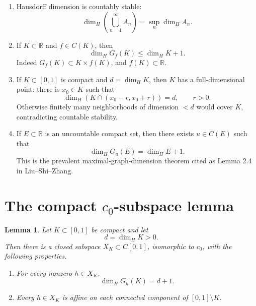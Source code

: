 \documentclass[11pt]{article}
\newtheorem*{lemma}{Lemma}
\newcommand{\RR}{\mathbb R}
\newcommand{\dimH}{\dim_{\!H}}
\begin{document}
\begin{enumerate}[label=(F\arabic*),leftmargin=*]
\item Hausdorff dimension is countably stable:
\[
\dimH\left(\bigcup_{n=1}^{\infty} A_n\right)=\sup_n \dimH A_n.
\]
\item If \(K\subset\RR\) and \(f\in C(K)\), then
\[
\dimH G_f(K)\leq \dimH K+1.
\]
Indeed \(G_f(K)\subset K\times f(K)\), and \(f(K)\subset\RR\).
\item If \(K\subset[0,1]\) is compact and \(d=\dimH K\), then \(K\) has a full-dimensional point: there is \(x_0\in K\) such that
\[
\dimH(K\cap(x_0-r,x_0+r))=d,\qquad r>0.
\]
Otherwise finitely many neighborhoods of dimension \(<d\) would cover \(K\), contradicting countable stability.
\item If \(E\subset\RR\) is an uncountable compact set, then there exists \(u\in C(E)\) such that
\[
\dimH G_u(E)=\dimH E+1.
\]
This is the prevalent maximal-graph-dimension theorem cited as Lemma 2.4 in Liu--Shi--Zhang.
\end{enumerate}

\section*{The compact \(c_0\)-subspace lemma}

\begin{lemma}\label{lem:c0-compact}
Let \(K\subset[0,1]\) be compact and let
\[
d=\dimH K>0.
\]
Then there is a closed subspace \(X_K\subset C[0,1]\), isomorphic to \(c_0\), with the following properties.
\begin{enumerate}[label=(\roman*),leftmargin=*]
\item For every nonzero \(h\in X_K\),
\[
\dimH G_h(K)=d+1.
\]
\item Every \(h\in X_K\) is affine on each connected component of \([0,1]\setminus K\).
\end{enumerate}
\end{lemma}
\end{document}
